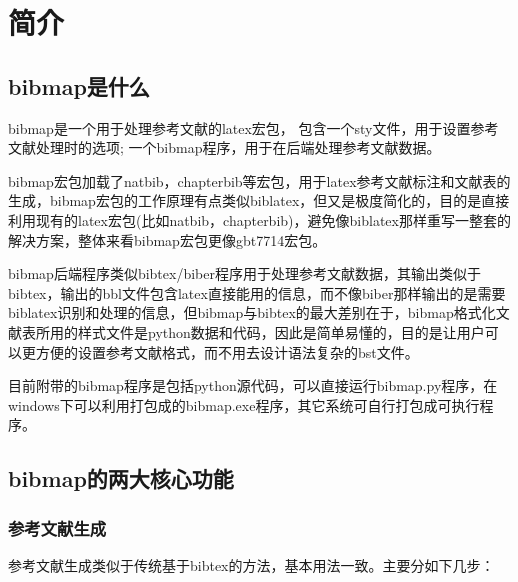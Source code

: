 \documentclass{article}
\begin{document}
\thispagestyle{empty}
\begin{center}

\vspace{0.3cm}


\end{center}

\section{简介}

\subsection{bibmap是什么}

bibmap是一个用于处理参考文献的latex宏包，
包含一个sty文件，用于设置参考文献处理时的选项; 
一个bibmap程序，用于在后端处理参考文献数据。

bibmap宏包加载了natbib，chapterbib等宏包，用于latex参考文献标注和文献表的生成，bibmap宏包的工作原理有点类似biblatex，但又是极度简化的，目的是直接利用现有的latex宏包(比如natbib，chapterbib)，避免像biblatex那样重写一整套的解决方案，整体来看bibmap宏包更像gbt7714宏包。

bibmap后端程序类似bibtex/biber程序用于处理参考文献数据，其输出类似于bibtex，输出的bbl文件包含latex直接能用的信息，而不像biber那样输出的是需要biblatex识别和处理的信息，但bibmap与bibtex的最大差别在于，bibmap格式化文献表所用的样式文件是python数据和代码，因此是简单易懂的，目的是让用户可以更方便的设置参考文献格式，而不用去设计语法复杂的bst文件。

目前附带的bibmap程序是包括python源代码，可以直接运行bibmap.py程序，在windows下可以利用打包成的bibmap.exe程序，其它系统可自行打包成可执行程序。

\subsection{bibmap的两大核心功能}

\subsubsection{参考文献生成}

参考文献生成类似于传统基于bibtex的方法，基本用法一致。主要分如下几步：
\end{document}
